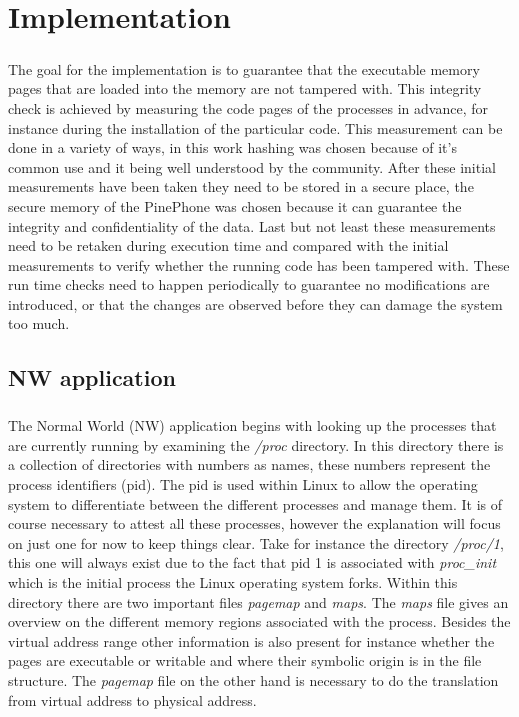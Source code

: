 \chapter{Implementation}

\paragraph*{}%
The goal for the implementation is to guarantee that the executable memory pages that are loaded into the memory are not tampered with. This integrity check is achieved by measuring the code pages of the processes in advance, for instance during the installation of the particular code. This measurement can be done in a variety of ways, in this work hashing was chosen because of it's common use and it being well understood by the community. After these initial measurements have been taken they need to be stored in a secure place, the secure memory of the PinePhone was chosen because it can guarantee the integrity and confidentiality of the data. Last but not least these measurements need to be retaken during execution time and compared with the initial measurements to verify whether the running code has been tampered with. These run time checks need to happen periodically to guarantee no modifications are introduced, or that the changes are observed before they can damage the system too much.

\section{NW application}

\paragraph*{}%
The Normal World (NW) application begins with looking up the processes that are currently running by examining the \textit{/proc} directory. In this directory there is a collection of directories with numbers as names, these numbers represent the process identifiers (pid). The pid is used within Linux to allow the operating system to differentiate between the different processes and manage them. It is of course necessary to attest all these processes, however the explanation will focus on just one for now to keep things clear. Take for instance the directory \textit{/proc/1}, this one will always exist due to the fact that pid 1 is associated with \textit{proc\_init} which is the initial process the Linux operating system forks. Within this directory there are two important files \textit{pagemap} and \textit{maps}. The \textit{maps} file gives an overview on the different memory regions associated with the process. Besides the virtual address range other information is also present for instance whether the pages are executable or writable and where their symbolic origin is in the file structure. The \textit{pagemap} file on the other hand is necessary to do the translation from virtual address to physical address.

